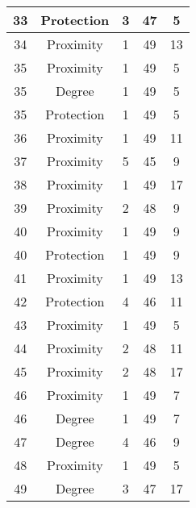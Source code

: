 \documentclass[results.tex]{subfiles}
\begin{document}
\begin{center}
\begin{tabular}{| c || c | c | c | c |}
    33 & Protection & 3 & 47 & 5 \\ 
    \hline
    34 & Proximity & 1 & 49 & 13 \\ 
    \hline
    35 & Proximity & 1 & 49 & 5 \\ 
    \hline
    35 & Degree & 1 & 49 & 5 \\ 
    \hline
    35 & Protection & 1 & 49 & 5 \\ 
    \hline
    36 & Proximity & 1 & 49 & 11 \\ 
    \hline
    37 & Proximity & 5 & 45 & 9 \\ 
    \hline
    38 & Proximity & 1 & 49 & 17 \\ 
    \hline
    39 & Proximity & 2 & 48 & 9 \\ 
    \hline
    40 & Proximity & 1 & 49 & 9 \\ 
    \hline
    40 & Protection & 1 & 49 & 9 \\ 
    \hline
    41 & Proximity & 1 & 49 & 13 \\ 
    \hline
    42 & Protection & 4 & 46 & 11 \\ 
    \hline
    43 & Proximity & 1 & 49 & 5 \\ 
    \hline
    44 & Proximity & 2 & 48 & 11 \\ 
    \hline
    45 & Proximity & 2 & 48 & 17 \\ 
    \hline
    46 & Proximity & 1 & 49 & 7 \\ 
    \hline
    46 & Degree & 1 & 49 & 7 \\ 
    \hline
    47 & Degree & 4 & 46 & 9 \\ 
    \hline
    48 & Proximity & 1 & 49 & 5 \\ 
    \hline
    49 & Degree & 3 & 47 & 17 \\ 
    \hline   \end{tabular}
\end{center}
\end{document}
